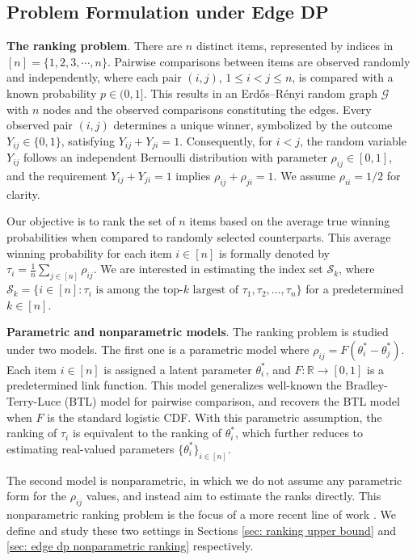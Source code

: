 \documentclass[letterpaper,12pt]{article}
\numberwithin{equation}{section}
\theoremstyle{plain}
\numberwithin{Theorem}{section}
\numberwithin{corollary}{section}
\numberwithin{proposition}{section}
\numberwithin{Lemma}{section}
{
	\theoremstyle{definition}
	\newtheorem{Definition}{Definition}
	\newtheorem{example}{Example}
	\numberwithin{example}{section}
	\newtheorem{fact}{Fact}
	\numberwithin{fact}{section}
	\newtheorem{remark}{Remark}
}
\newcommand{\1}{\mathbbm{1}}
\begin{document}
\subsection{Problem Formulation under Edge DP}\label{sec: edge dp problem formulation}
{\bf The ranking problem}. There are $n$ distinct items, represented by indices in $[n] = \{1, 2, 3, \cdots, n\}$. Pairwise comparisons between items are observed randomly and independently, where each pair $(i, j)$, $1 \leq i < j \leq n$, is compared with a known probability $p \in (0, 1]$. This results in an Erd\H{o}s--R\'enyi random graph $\mathcal{G}$ with $n$ nodes and the observed comparisons constituting the edges. Every observed pair $(i, j)$ determines a unique winner, symbolized by the outcome $Y_{ij} \in \{0, 1\}$, satisfying $Y_{ij} + Y_{ji} = 1$. Consequently, for $i<j$, the random variable $Y_{ij}$ follows an independent Bernoulli distribution with parameter $\rho_{ij} \in [0, 1]$, and the requirement $Y_{ij} + Y_{ji} = 1$ implies $\rho_{ij} + \rho_{ji} = 1$. We assume $\rho_{ii} = 1/2$ for clarity.
 
Our objective is to rank the set of $n$ items based on the average true winning probabilities when compared to randomly selected counterparts. This average winning probability for each item $i \in [n]$ is formally denoted by $\tau_i = \frac{1}{n}\sum_{j \in [n]} \rho_{ij}$. We are interested in estimating the index set $\mathcal S_k$, where $\mathcal S_k = \{i \in [n]: \tau_{i} \text{ is among the top-$k$ largest of } \tau_1, \tau_2, \ldots, \tau_n\}$ for a predetermined $k \in [n]$.

{\bf Parametric and nonparametric models}. The ranking problem is studied under two models. The first one is a parametric model where $\rho_{ij} = F(\theta^*_i - \theta^*_j)$. Each item $i \in [n]$ is assigned a latent parameter $\theta^*_i$, and $F: \mathbb R \to [0, 1]$ is a predetermined link function. This model generalizes well-known the Bradley-Terry-Luce (BTL) model \cite{bradley1952rank, luce1959individual} for pairwise comparison, and recovers the BTL model when $F$ is the standard logistic CDF. With this parametric assumption, the ranking of $\tau_i$ is equivalent to the ranking of $\theta_i^*$, which further reduces to estimating real-valued parameters $\{\theta^*_i\}_{i \in [n]}$. 

The second model is nonparametric, in which we do not assume any parametric form for the $\rho_{ij}$ values, and instead aim to estimate the ranks directly. This nonparametric ranking problem is the focus of a more recent line of work \cite{shah2017simple, chen2017competitive, shah2017simple, shah2019feeling}. We define and study these two settings in Sections \ref{sec: ranking upper bound} and \ref{sec: edge dp nonparametric ranking} respectively.
\end{document}
